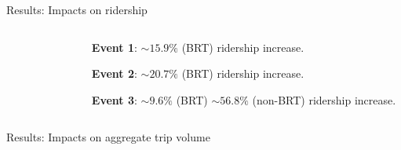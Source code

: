 \documentclass[notes,11pt, aspectratio=169]{beamer}
\newenvironment{wideitemize}{\itemize\addtolength{\itemsep}{0.4em}}{\enditemize}
\begin{document}
\begin{frame}{Results: Impacts on ridership}
	\begin{columns}
	\begin{column}{0.7\textwidth}
	\begin{figure}
	\end{figure}
\end{column}
\begin{column}{0.3\textwidth}
\begin{wideitemize}
\item \textbf{Event 1}: $\sim 15.9\%$ (BRT) ridership increase.
\item \textbf{Event 2}: $\sim 20.7\%$ (BRT) ridership increase.
\item \textbf{Event 3}: $\sim 9.6\%$ (BRT) $\sim 56.8\%$ (non-BRT)  ridership increase.
\end{wideitemize}	
\end{column}
\end{columns}
\end{frame}

\begin{frame}{Results: Impacts on aggregate trip volume}
	\begin{figure}
	\end{figure}
\end{frame}
\end{document}
